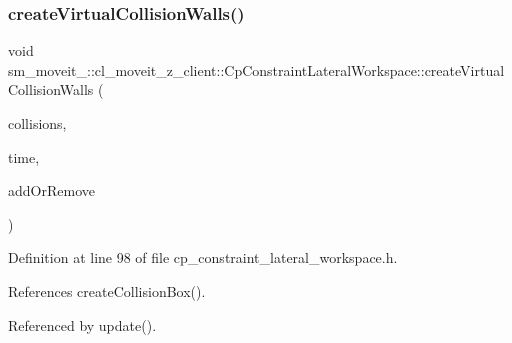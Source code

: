 \subsubsection{\texorpdfstring{create\+Virtual\+Collision\+Walls()}{createVirtualCollisionWalls()}}
{\footnotesize\ttfamily void sm\+\_\+moveit\+\_\+::cl\+\_\+moveit\+\_\+z\+\_\+client\+::\+Cp\+Constraint\+Lateral\+Workspace\+::create\+Virtual\+Collision\+Walls (\begin{DoxyParamCaption}\item[{std\+::vector$<$ moveit\+\_\+msgs\+::\+Collision\+Object $>$ \&}]{collisions,  }\item[{const ros\+::\+Time \&}]{time,  }\item[{int}]{add\+Or\+Remove }\end{DoxyParamCaption})\hspace{0.3cm}{\ttfamily [inline]}}



Definition at line 98 of file cp\+\_\+constraint\+\_\+lateral\+\_\+workspace.\+h.



References create\+Collision\+Box().



Referenced by update().



